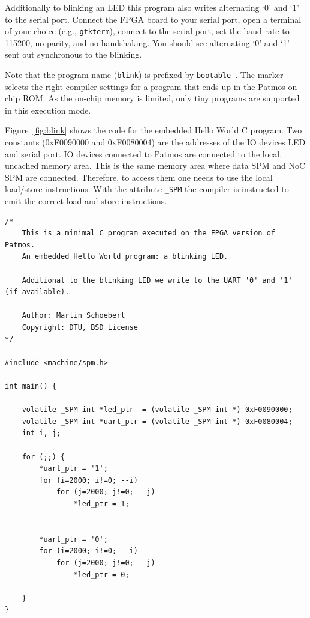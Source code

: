 \documentclass[a4paper,fontsize=10pt,twoside,DIV15,BCOR12mm,headinclude=true,footinclude=false,pagesize,bibtotoc]{scrbook}
\newcommand{\code}[1]{{\texttt{#1}}}
\newcommand{\comment}[3]{

\textsf{\textbf{#1}} {\color{#3}#2}}
\newcommand{\martin}[1]{\comment{Martin}{#1}{Blue}}
\renewcommand{\martin}[1]{}
\begin{document}
Additionally to blinking an LED this program also writes alternating `0' and `1'
to the serial port. Connect the FPGA board to your serial port,
open a terminal of your choice (e.g., \code{gtkterm}), connect to the serial port,
set the baud rate to 115200, no parity, and no handshaking.
You should see alternating `0' and `1' sent out synchronous to the blinking.

Note that the program name (\code{blink}) is prefixed by \code{bootable-}.
The marker selects the right compiler settings for a program that ends up in
the Patmos on-chip ROM. As the on-chip memory is limited, only tiny programs
are supported in this execution mode.

Figure~\ref{fig:blink} shows the code for the embedded Hello World
C program. Two constants (0xF0090000 and 0xF0080004) are the addresses
of the IO devices LED and serial port. IO devices connected to Patmos are
connected to the local, uncached memory area. This is the same memory
area where data SPM and NoC SPM are connected. Therefore, to access them
one needs to use the local load/store instructions. With the attribute \code{\_SPM}
the compiler is instructed to emit the correct load and store instructions.

\begin{lstlisting}[float,caption={A blinking LED\label{fig:blink}}]
/*
    This is a minimal C program executed on the FPGA version of Patmos.
    An embedded Hello World program: a blinking LED.

    Additional to the blinking LED we write to the UART '0' and '1' (if available).

    Author: Martin Schoeberl
    Copyright: DTU, BSD License
*/

#include <machine/spm.h>

int main() {

    volatile _SPM int *led_ptr  = (volatile _SPM int *) 0xF0090000;
    volatile _SPM int *uart_ptr = (volatile _SPM int *) 0xF0080004;
    int i, j;

    for (;;) {
        *uart_ptr = '1';
        for (i=2000; i!=0; --i)
            for (j=2000; j!=0; --j)
                *led_ptr = 1;


        *uart_ptr = '0';
        for (i=2000; i!=0; --i)
            for (j=2000; j!=0; --j)
                *led_ptr = 0;

    }
}
\end{lstlisting}

\martin{TODO: we need to streamline the make process a little bit.
The targets might be a little bit confusing. Patmos is compiled two times.}
\end{document}

